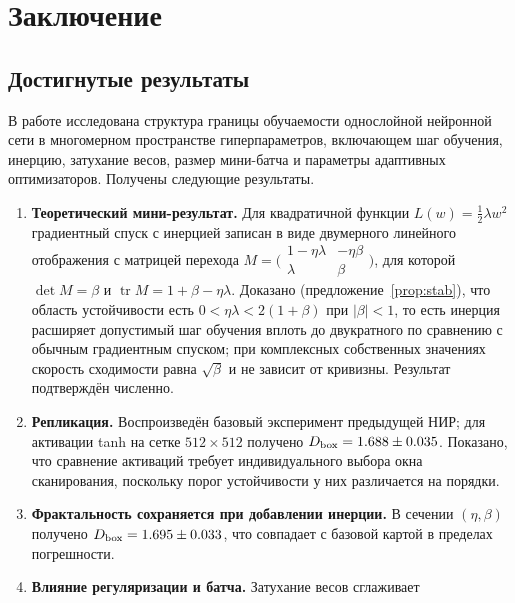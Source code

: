 \section{Заключение}\label{sec:conclusion}

\subsection{Достигнутые результаты}

В работе исследована структура границы обучаемости однослойной нейронной сети
в многомерном пространстве гиперпараметров, включающем шаг обучения, инерцию,
затухание весов, размер мини-батча и параметры адаптивных оптимизаторов.
Получены следующие результаты.

\begin{enumerate}[leftmargin=*,topsep=2pt,itemsep=3pt]
  \item \textbf{Теоретический мини-результат.} Для квадратичной функции
        $L(w)=\tfrac12\lambda w^2$ градиентный спуск с инерцией записан в виде
        двумерного линейного отображения с матрицей перехода
        $M = \bigl(\begin{smallmatrix} 1-\eta\lambda & -\eta\beta \\ \lambda & \beta \end{smallmatrix}\bigr)$,
        для которой $\det M = \beta$ и $\operatorname{tr} M = 1+\beta-\eta\lambda$.
        Доказано (предложение~\ref{prop:stab}), что область устойчивости есть
        $0 < \eta\lambda < 2(1+\beta)$ при $|\beta|<1$, то есть инерция
        расширяет допустимый шаг обучения вплоть до двукратного по сравнению
        с обычным градиентным спуском; при комплексных собственных значениях
        скорость сходимости равна $\sqrt{\beta}$ и не зависит от кривизны.
        Результат подтверждён численно.
  \item \textbf{Репликация.} Воспроизведён базовый эксперимент предыдущей НИР;
        для активации tanh на сетке $512\times512$ получено
        $D_{\mathrm{box}} = 1.688 \pm 0.035$. Показано, что
        сравнение активаций требует индивидуального выбора окна сканирования,
        поскольку порог устойчивости у них различается на порядки.
  \item \textbf{Фрактальность сохраняется при добавлении инерции.} В сечении
        $(\eta,\beta)$ получено $D_{\mathrm{box}} = 1.695 \pm 0.033$,
        что совпадает с базовой картой в пределах погрешности.
  \item \textbf{Влияние регуляризации и батча.} Затухание весов сглаживает

\end{enumerate}
